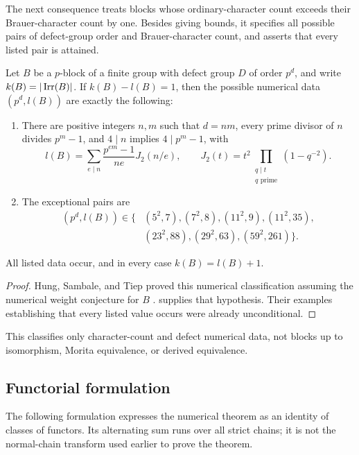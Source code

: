 The next consequence treats blocks whose ordinary-character count
exceeds their Brauer-character count by one. Besides giving bounds,
it specifies all possible pairs
of defect-group order and Brauer-character count, and asserts that
every listed pair is attained.

\begin{corollary}\label{cor:character-data}
Let $B$ be a $p$-block of a finite group with defect group $D$ of order
$p^d$, and write $k(B)=|\operatorname{Irr}(B)|$. If $k(B)-l(B)=1$, then the possible
numerical data $(p^d,l(B))$ are exactly the following:
\begin{enumerate}[label=\textup{(\roman*)}]
\item There are positive integers $n,m$ such that $d=nm$, every prime divisor of $n$
      divides $p^m-1$, and $4\mid n$ implies $4\mid p^m-1$, with
      \[
       l(B)=\sum_{e\mid n}\frac{p^{em}-1}{ne}J_2(n/e),\qquad
       J_2(t)=t^2\prod_{\substack{q\mid t\\q\text{ prime}}}(1-q^{-2}).
      \]
\item The exceptional pairs are
      \[
       \begin{aligned}
       (p^d,l(B))\in\{&(5^2,7),(7^2,8),(11^2,9),(11^2,35),\\
                       &(23^2,88),(29^2,63),(59^2,261)\}.
       \end{aligned}
      \]
\end{enumerate}
All listed data occur, and in every case $k(B)=l(B)+1$.
\end{corollary}

\begin{proof}
Hung, Sambale, and Tiep proved this numerical classification assuming
the numerical weight conjecture for $B$ \cite[Theorem~3.3]{HST2024}.
 supplies that hypothesis. Their examples establishing
that every listed value occurs were already unconditional.
\end{proof}

This classifies only character-count and defect numerical data, not blocks
up to isomorphism, Morita equivalence, or derived equivalence.

\subsection{Functorial formulation}

The following formulation expresses the numerical theorem as an identity
of classes of functors. Its alternating sum runs over all strict chains;
it is not the normal-chain transform used earlier to prove the theorem.

